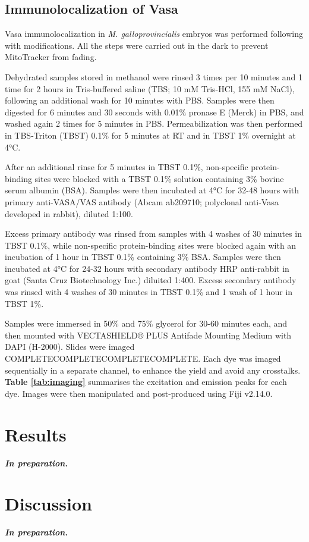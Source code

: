 \documentclass[../main.tex]{subfiles}
\begin{document}
\subsection{Immunolocalization of Vasa} \label{chapter4_MM_immuno}
Vasa immunolocalization in \textit{M. galloprovincialis} embryos was performed following \textbf{\cite{milani2011doubly}} with modifications. All the steps were carried out in the dark to prevent MitoTracker from fading.

Dehydrated samples stored in methanol were rinsed 3 times per 10 minutes and 1 time for 2 hours in Tris-buffered saline (TBS; 10 mM Tris-HCl, 155 mM NaCl), following an additional wash for 10 minutes with PBS. Samples were then digested for 6 minutes and 30 seconds with 0.01\% pronase E (Merck) in PBS, and washed again 2 times for 5 minutes in PBS. Permeabilization was then performed in TBS-Triton (TBST) 0.1\% for 5 minutes at RT and in TBST 1\% overnight at 4°C.

After an additional rinse for 5 minutes in TBST 0.1\%, non-specific protein-binding sites were blocked with a TBST 0.1\% solution containing 3\% bovine serum albumin (BSA). Samples were then incubated at 4°C for 32-48 hours with primary anti-VASA/VAS antibody (Abcam ab209710; polyclonal anti-Vasa developed in rabbit), diluted 1:100.

Excess primary antibody was rinsed from samples with 4 washes of 30 minutes in TBST 0.1\%, while non-specific protein-binding sites were blocked again with an incubation of 1 hour in TBST 0.1\% containing 3\% BSA. Samples were then incubated at 4°C for 24-32 hours with secondary antibody HRP
anti-rabbit in goat (Santa Cruz Biotechnology Inc.) diluited 1:400. Excess secondary antibody was rinsed with 4 washes of 30 minutes in TBST 0.1\% and 1 wash of 1 hour in TBST 1\%.

Samples were immersed in 50\% and 75\% glycerol for 30-60 minutes each, and then mounted with VECTASHIELD® PLUS Antifade Mounting Medium with DAPI (H-2000). Slides were imaged COMPLETECOMPLETECOMPLETECOMPLETE. Each dye was imaged sequentially in a separate channel, to enhance the yield and avoid any crosstalks. \textbf{Table \ref{tab:imaging}} summarises the excitation and emission peaks for each dye. Images were then manipulated and post-produced using Fiji v2.14.0.

\section{Results} \label{chapter4_results}

\textbf{\textit{In preparation.}}

\section{Discussion} \label{chapter4_discussion}

\textbf{\textit{In preparation.}}
\end{document}
